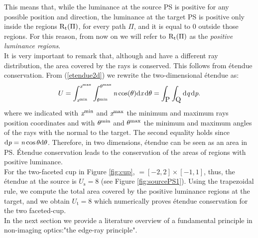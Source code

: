 This means that, while the luminance at the source PS is positive for any possible position and direction, the luminance at the target PS is positive only inside the regions $\mbox{$\textup{R}$}_\textrm{t}(\Pi)$, for every path $\Pi$, and it is equal to $0$ outside those regions. For this reason, from now on we will refer to $\mbox{$\textup{R}$}_\textrm{t}(\Pi)$ as the \textit{positive luminance regions}. \\ \indent
It is very important to remark that, although  and  have a different ray distribution, the area covered by the rays is conserved. This follows from \'{e}tendue conservation. From (\ref{etendue2d}) we rewrite the two-dimensional \'{e}tendue as:
\begin{equation}
U = \int_{\textit{x}^{\textrm{min}}}^{\textit{x}^{\textrm{max}}} \int_{\theta^{\textrm{min}}}^{\theta^{\textrm{max}}} \textit{n} \cos(\theta)\textrm{d}\textit{x}\,\textrm{d}\theta= \int_{\mbox{$\textup{P}_{\textit{}}$}}\int_{\mbox{$\textup{Q}_{\textit{}}$}} \textrm{d}\textit{q}\,\textrm{d}\textit{p}.
\end{equation}
where we indicated with $\textit{x}^{\textrm{min}}$ and $\textit{x}^{\textrm{max}}$ the minimum and maximum rays position coordinates and with $\theta^{\textrm{min}}$ and $\theta^{\textrm{max}}$ the minimum and maximum angles of the rays with the normal to the target. The second equality holds since $\textrm{d}\textit{p}= \textit{n}\cos \theta\textrm{d}\theta$.
Therefore, in two dimensions, \'{e}tendue can be seen as an area in PS. \'{E}tendue conservation leads to the conservation of the areas of regions with positive luminance.\\ \indent
For the two-faceted cup in Figure \ref{fig:cup}, $= [-2,2]\times[-1,1]$, thus, the \'{e}tendue at the source is $U_\textrm{s}=8$ (see Figure \ref{fig:sourcePS1}). Using the trapezoidal rule, we compute the total area covered by the positive luminance regions at the target, and we obtain $U_\textrm{t}=8$ which numerically proves \'{e}tendue conservation for the two faceted-cup. \\ \indent 
In the next section we provide a literature overview of a fundamental principle in non-imaging optics:"the edge-ray principle".

